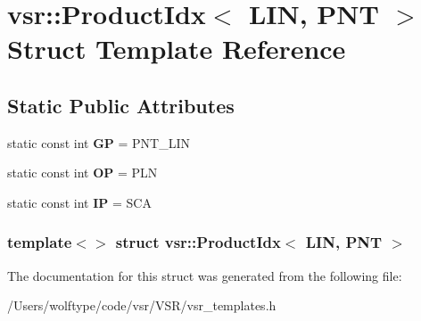 \hypertarget{structvsr_1_1_product_idx_3_01_l_i_n_00_01_p_n_t_01_4}{\section{vsr\-:\-:Product\-Idx$<$ L\-I\-N, P\-N\-T $>$ Struct Template Reference}
\label{structvsr_1_1_product_idx_3_01_l_i_n_00_01_p_n_t_01_4}
}
\subsection*{Static Public Attributes}
\begin{DoxyCompactItemize}
\item 
\hypertarget{structvsr_1_1_product_idx_3_01_l_i_n_00_01_p_n_t_01_4_ac39594813ef32f439a3e17c0d1c103c1}{static const int {\bfseries G\-P} = P\-N\-T\-\_\-\-L\-I\-N}\label{structvsr_1_1_product_idx_3_01_l_i_n_00_01_p_n_t_01_4_ac39594813ef32f439a3e17c0d1c103c1}

\item 
\hypertarget{structvsr_1_1_product_idx_3_01_l_i_n_00_01_p_n_t_01_4_a8e3efb3e1bc5ec79656bf93d8c1c735b}{static const int {\bfseries O\-P} = P\-L\-N}\label{structvsr_1_1_product_idx_3_01_l_i_n_00_01_p_n_t_01_4_a8e3efb3e1bc5ec79656bf93d8c1c735b}

\item 
\hypertarget{structvsr_1_1_product_idx_3_01_l_i_n_00_01_p_n_t_01_4_a9c358a392a44342fc87c03aad5f2fe2d}{static const int {\bfseries I\-P} = S\-C\-A}\label{structvsr_1_1_product_idx_3_01_l_i_n_00_01_p_n_t_01_4_a9c358a392a44342fc87c03aad5f2fe2d}

\end{DoxyCompactItemize}
\subsubsection*{template$<$$>$ struct vsr\-::\-Product\-Idx$<$ L\-I\-N, P\-N\-T $>$}



The documentation for this struct was generated from the following file\-:\begin{DoxyCompactItemize}
\item 
/\-Users/wolftype/code/vsr/\-V\-S\-R/vsr\-\_\-templates.\-h\end{DoxyCompactItemize}
